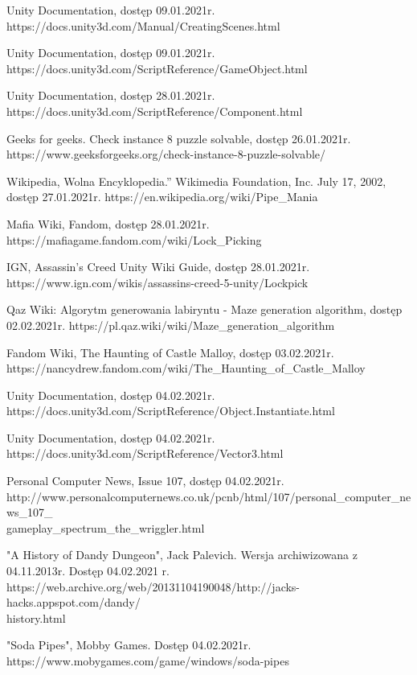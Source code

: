\documentclass[oneside,polski,logo]{amuthesis}
\begin{document}
\begin{thebibliography}{7}
Unity Documentation, dostęp 09.01.2021r.
https://docs.unity3d.com/Manual/CreatingScenes.html

Unity Documentation, dostęp 09.01.2021r.
https://docs.unity3d.com/ScriptReference/GameObject.html

Unity Documentation, dostęp 28.01.2021r.
https://docs.unity3d.com/ScriptReference/Component.html

Geeks for geeks. Check instance 8 puzzle solvable, dostęp 26.01.2021r.
https://www.geeksforgeeks.org/check-instance-8-puzzle-solvable/

Wikipedia, Wolna Encyklopedia.” Wikimedia Foundation, Inc. July 17, 2002, dostęp 27.01.2021r.
https://en.wikipedia.org/wiki/Pipe\_Mania

Mafia Wiki, Fandom, dostęp 28.01.2021r.
https://mafiagame.fandom.com/wiki/Lock\_Picking

IGN, Assassin's Creed Unity Wiki Guide, dostęp 28.01.2021r.
https://www.ign.com/wikis/assassins-creed-5-unity/Lockpick

Qaz Wiki: Algorytm generowania labiryntu - Maze generation algorithm, dostęp 02.02.2021r.
https://pl.qaz.wiki/wiki/Maze\_generation\_algorithm

Fandom Wiki, The Haunting of Castle Malloy, dostęp 03.02.2021r.
https://nancydrew.fandom.com/wiki/The\_Haunting\_of\_Castle\_Malloy

Unity Documentation, dostęp 04.02.2021r.
https://docs.unity3d.com/ScriptReference/Object.Instantiate.html

Unity Documentation, dostęp 04.02.2021r.
https://docs.unity3d.com/ScriptReference/Vector3.html

Personal Computer News, Issue 107, dostęp 04.02.2021r.
http://www.personalcomputernews.co.uk/pcnb/html/107/personal\_computer\_news\_107\_\\gameplay\_spectrum\_the\_wriggler.html

 "A History of Dandy Dungeon", Jack Palevich. Wersja archiwizowana z 04.11.2013r. Dostęp 04.02.2021 r.
https://web.archive.org/web/20131104190048/http://jacks-hacks.appspot.com/dandy/\\history.html

"Soda Pipes", Mobby Games. Dostęp 04.02.2021r.
https://www.mobygames.com/game/windows/soda-pipes

\end{thebibliography}
\end{document}
